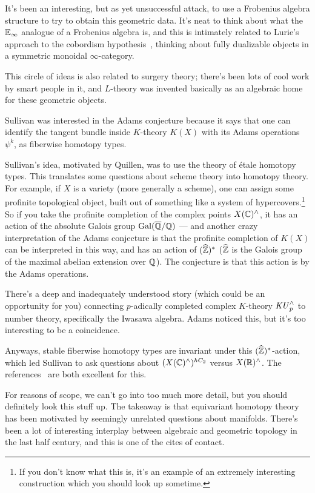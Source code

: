 It's been an interesting, but as yet unsuccessful attack, to use a Frobenius algebra structure to try to obtain
this geometric data. It's neat to think about what the $\mathbb E_\infty$ analogue of a Frobenius algebra is, and this is
intimately related to Lurie's approach to the cobordism hypothesis~\cite{Lur09}, thinking about fully dualizable
objects in a symmetric monoidal $\infty$-category.

This circle of ideas is also related to surgery theory; there's been lots of cool work by smart people in it, and
$L$-theory was invented basically as an algebraic home for these geometric objects.

Sullivan was interested in the Adams conjecture because it says that one can identify the tangent bundle inside
$K$-theory $K(X)$ with its Adams operations $\psi^k$, as fiberwise homotopy types.

Sullivan's idea, motivated by Quillen, was to use the theory of étale homotopy types. This translates some
questions about scheme theory into homotopy theory. For example, if $X$ is a variety (more generally a scheme), one
can assign some profinite topological object, built out of something like a system of hypercovers.\footnote{If you
don't know what this is, it's an example of an extremely interesting construction which you should look up
sometime.} So if you take the profinite completion of the complex points $X(\mathbb C)^\land$, it has an action of the
absolute Galois group $\operatorname{Gal}(\overline{\mathbb Q}/\mathbb Q)$ --- and another crazy interpretation of the Adams conjecture is that
the profinite completion of $K(X)$ can be interpreted in this way, and has an action of $(\widehat{\mathbb Z})^*$
($\widehat{\mathbb Z}$ is the Galois group of the maximal abelian extension over $\mathbb Q$). The conjecture is that this action
is by the Adams operations.

There's a deep and inadequately understood story (which could be an opportunity for you) connecting $p$-adically
completed complex $K$-theory $\mathit{KU}_p^\land$ to number theory, specifically the Iwasawa algebra. Adams noticed this,
but it's too interesting to be a coincidence.

Anyways, stable fiberwise homotopy types are invariant under this $(\widehat{\mathbb Z})^*$-action, which led Sullivan to
ask questions about $(X(\mathbb C)^\wedge)^{hC_2}$ versus $X(\mathbb R)^\wedge$. The references~\cite{MITNotes, Genetics} are
both excellent for this.

For reasons of scope, we can't go into too much more detail, but you should definitely look this stuff up. The
takeaway is that equivariant homotopy theory has been motivated by seemingly unrelated questions about manifolds.
There's been a lot of interesting interplay between algebraic and geometric topology in the last half century, and
this is one of the cites of contact.
